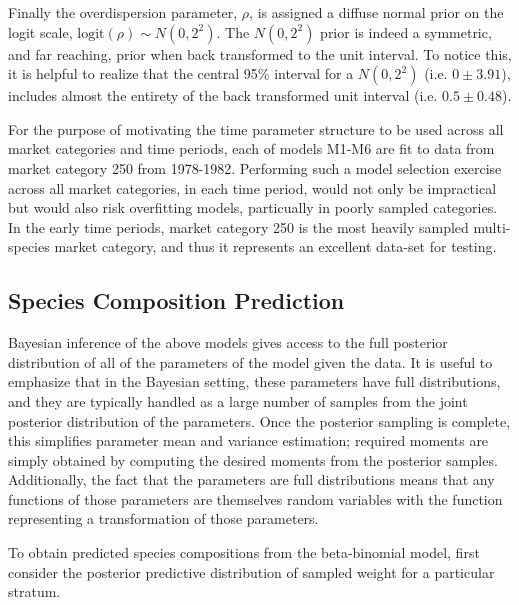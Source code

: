 \documentclass[12pt]{article}
\begin{document}
Finally the overdispersion parameter, \(\rho\), is assigned a diffuse
normal prior on the logit scale, \(\text{logit}(\rho) \sim N(0, 2^2)\).
The \(N(0, 2^2)\) prior is indeed a symmetric, and far reaching, prior
when back transformed to the unit interval. To notice this, it is
helpful to realize that the central 95\% interval for a \(N(0, 2^2)\)
(i.e. \(0\pm3.91\)), includes almost the entirety of the back
transformed unit interval (i.e. \(0.5\pm0.48\)).

For the purpose of motivating the time parameter structure to be used across 
all market categories and time periods, each of models M1-M6 are fit to data 
from market category 250 from 1978-1982. %
Performing such a model selection exercise across all market categories, in 
each time period, would not only be impractical but would also risk overfitting 
models, particually in poorly sampled categories. In the early time periods, 
market category 250 is the most heavily sampled multi-species market category, 
and thus it represents an excellent data-set for testing.


\subsection{Species Composition Prediction}\label{species-composition-prediction}

Bayesian inference of the above models gives access to the full
posterior distribution of all of the parameters of the model given the
data. It is useful to emphasize that in the Bayesian setting, these
parameters have full distributions, and they are typically handled as a
large number of samples from the joint posterior distribution of the
parameters. Once the posterior sampling is complete, this simplifies
parameter mean and variance estimation; required moments are simply
obtained by computing the desired moments from the posterior samples.
Additionally, the fact that the parameters are full distributions means
that any functions of those parameters are themselves random variables
with the function representing a transformation of those parameters.

To obtain predicted species compositions from the beta-binomial model, first 
consider the posterior predictive distribution of sampled weight for a 
particular stratum.
\end{document}

